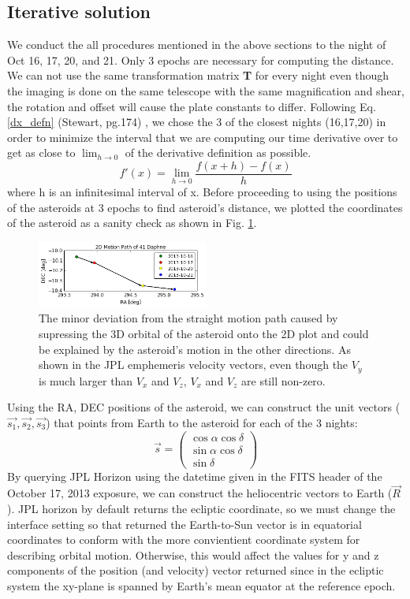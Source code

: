 \documentclass[authoryear, 12pt,5p, times]{elsarticle}
\begin{document}
    \subsection{Iterative solution}
    We conduct the all procedures mentioned in the above sections to the night of Oct 16, 17, 20, and 21. Only 3 epochs are necessary for computing the distance. We can not use the same transformation matrix \textbf{T} for every night even though the imaging is done on the same telescope with the same magnification and shear, the rotation and offset will cause the plate constants to differ. Following Eq.\ref{dx_defn} (Stewart, pg.174) , we chose the 3 of the closest nights (16,17,20)  in order to minimize the interval that we are computing our time derivative over to get as close to $\lim_{h\rightarrow 0}$ of the derivative definition as possible.
\begin{equation}
f'(x) = \lim_{h\rightarrow 0}\frac{f(x+h)-f(x)}{h}
\label{dx_defn}
\end{equation}
where h is an infinitesimal interval of x. Before proceeding to using the positions of the asteroids at 3 epochs to find  asteroid's distance, we plotted the coordinates of the asteroid as a sanity check as shown in Fig. \ref{motion_path}.
\begin{figure}[h!]
\includegraphics[width=0.5\textwidth]{figures/motion_path}
\caption{The minor deviation from the straight motion path caused by supressing the 3D orbital of the asteroid onto the 2D plot and could be explained by the asteroid's motion in the other directions. As shown in the JPL emphemeris velocity vectors, even though the $V_y$ is much larger than $V_x$ and $V_z$, $V_x$ and $V_z$ are still non-zero.}
\label{motion_path}
\end{figure}

    Using the RA, DEC positions of the asteroid, we can construct the unit vectors ($\vec{s_1},\vec{s_2},\vec{s_3}$) that points from Earth to the asteroid for each of the 3 nights: 
    \begin{equation}
    \vec{s}=\begin{pmatrix}
\cos\alpha\cos\delta\\
\sin\alpha\cos\delta 
\\ \sin \delta
\end{pmatrix}
    \end{equation}
 By querying JPL Horizon  using the datetime given in the FITS header of the October 17, 2013 exposure, we can construct the heliocentric vectors to Earth ($\vec{R}$). JPL horizon by default returns the ecliptic coordinate, so we must change the interface setting so that returned the Earth-to-Sun vector is in equatorial coordinates to conform with the more convientient coordinate system for describing orbital motion. Otherwise, this would affect the values for y and z components of the position (and velocity) vector returned since in the ecliptic system the  xy-plane is spanned by  Earth's mean equator at the reference epoch.
    
\end{document}
